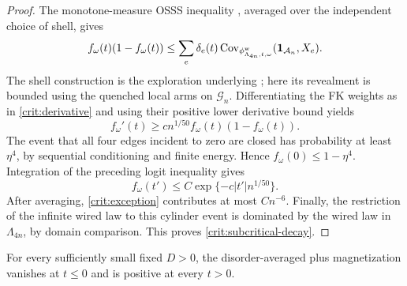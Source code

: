 \begin{proof}
The monotone-measure OSSS inequality
\cite[Theorem~1.1]{DCRT2019}, averaged over the independent choice of
shell, gives
\[
 f_\omega(t)(1-f_\omega(t))
 \le\sum_e\delta_e(t)
       \operatorname{Cov}_{\phi^{\mathrm w}_{\Lambda_{4n},t,\omega}}
                         (\mathbf 1_{\mathcal A_n},X_e).
\]
The shell construction is the exploration underlying
\cite[Lemma~3.2]{DCRT2019}; here its revealment is bounded using the
quenched local arms on $\mathcal G_n$.  Differentiating the FK weights
as in \eqref{crit:derivative} and using their positive lower derivative
bound yields
\[
 f_\omega'(t)\ge c n^{1/50}f_\omega(t)(1-f_\omega(t)).
\]
The event that all four edges incident to zero are closed has
probability at least $\eta^4$, by sequential conditioning and finite
energy.  Hence $f_\omega(0)\le1-\eta^4$.  Integration of the preceding
logit inequality gives
\[
 f_\omega(t')\le C\exp\{-c|t'|n^{1/50}\}.
\]
After averaging, \eqref{crit:exception} contributes at most $Cn^{-6}$.
Finally, the restriction of the infinite wired law to this cylinder
event is dominated by the wired law in $\Lambda_{4n}$, by domain
comparison.  This proves \eqref{crit:subcritical-decay}.
\end{proof}

\begin{proposition}
\label{crit:identification}
For every sufficiently small fixed $D>0$, the disorder-averaged plus
magnetization vanishes at $t\le0$ and is positive at every $t>0$.
\end{proposition}

